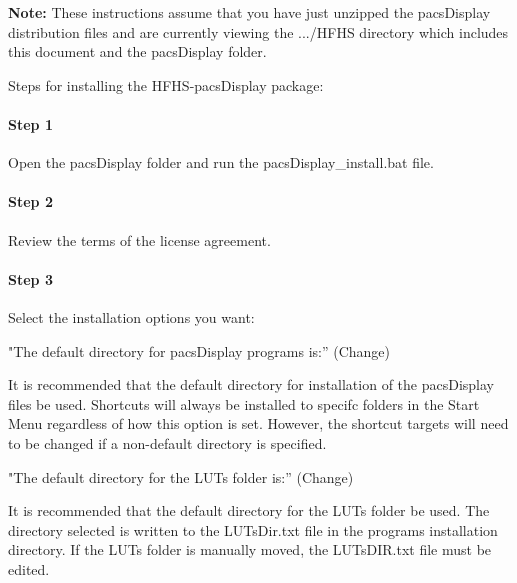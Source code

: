 \textbf{Note:} These instructions assume that you have just unzipped the pacsDisplay distribution files and are currently viewing the \textnormal{.../HFHS} directory which includes this document and the pacsDisplay folder. 

Steps for installing the HFHS-pacsDisplay package: 

\paragraph{Step 1} Open the \textnormal{pacsDisplay} folder and run the \textnormal{pacsDisplay\_install.bat} file.

\paragraph{Step 2} Review the terms of the license agreement.

\paragraph{Step 3} Select the installation options you want:
\bigskip

"The default directory for pacsDisplay programs is:'' (Change)


It is recommended that the default directory for installation of the pacsDisplay files be used. Shortcuts will always be installed to specifc folders in the Start Menu regardless of how this option is set. However, the shortcut targets will need to be changed if a non-default directory is specified.
\bigskip

"The default directory for the LUTs folder is:'' (Change)


It is recommended that the default directory for the LUTs folder be used. The directory selected is written to the \textnormal{LUTsDir.txt} file in the programs installation directory. If the LUTs folder is manually moved, the \textnormal{LUTsDIR.txt} file must be edited.
\bigskip

